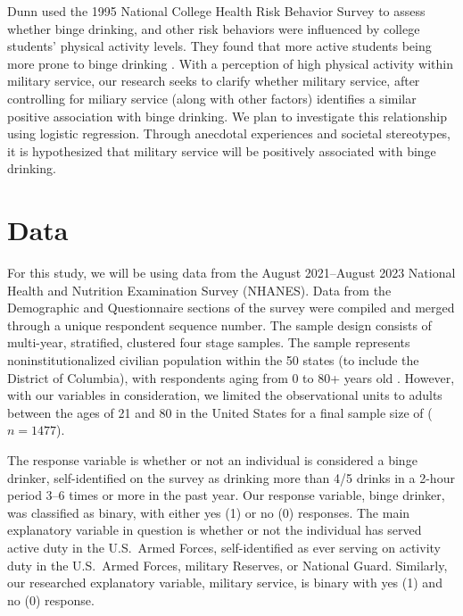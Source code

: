 \documentclass[12pt]{article}
\begin{document}
Dunn used the 1995 National College Health Risk Behavior Survey to assess whether binge drinking, and other risk behaviors were influenced by college students' physical activity levels. They found that more active students being more prone to binge drinking \citep{dunn2003effects}. With a perception of high physical activity within military service, our research seeks to clarify whether military service, after controlling for miliary service (along with other factors) identifies a similar positive association with binge drinking. We plan to investigate this relationship using logistic regression. Through anecdotal experiences and societal stereotypes, it is hypothesized that military service will be positively associated with binge drinking.

\section{Data}

For this study, we will be using data from the August 2021--August 2023 National Health and Nutrition Examination Survey (NHANES). Data from the Demographic and Questionnaire sections of the survey were compiled and merged through a unique respondent sequence number. The sample design consists of multi-year, stratified, clustered four stage samples. The sample represents noninstitutionalized civilian population within the 50 states (to include the District of Columbia), with respondents aging from 0 to 80+ years old \citep{nhanes2023}. However, with our variables in consideration, we limited the observational units to adults between the ages of 21 and 80 in the United States for a final sample size of ($n=1477$).

The response variable is whether or not an individual is considered a binge drinker, self-identified on the survey as drinking more than 4/5 drinks in a 2-hour period 3--6 times or more in the past year. Our response variable, binge drinker, was classified as binary, with either yes (1) or no (0) responses. The main explanatory variable in question is whether or not the individual has served active duty in the U.S.\ Armed Forces, self-identified as ever serving on activity duty in the U.S.\ Armed Forces, military Reserves, or National Guard. Similarly, our researched explanatory variable, military service, is binary with yes (1) and no (0) response.
\end{document}
